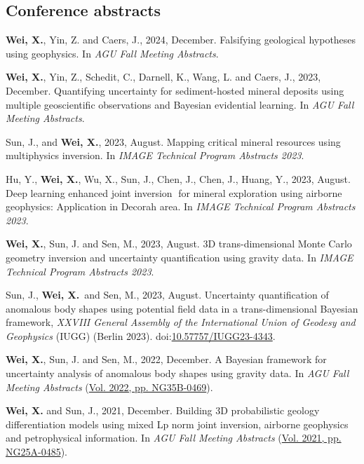 \documentclass[11pt, a4paper]{article}
\newcommand{\LastName}{Wei}
\newcommand{\Initials}{X}
\newcommand{\Wei}{\textbf{\LastName, \Initials.}}  %
\newcommand{\WeiSun}{\textbf{\LastName, \Initials.} and Sun, J.}  %
\newcommand{\DOI}[1]{doi:\href{https://doi.org/#1}{#1}}
\begin{document}
\subsection*{Conference abstracts}
\begin{etaremune}
	\item 	
	\Wei, Yin, Z. and Caers, J., 2024, December. Falsifying geological hypotheses using geophysics. In \emph{AGU Fall Meeting Abstracts}.
	
	\item 
	\Wei, Yin, Z., Schedit, C., Darnell, K., Wang, L. and Caers, J., 2023, December. Quantifying uncertainty for sediment-hosted mineral deposits using multiple geoscientific observations and Bayesian evidential learning. In \emph{AGU Fall Meeting Abstracts}.
	
	\item
	Sun, J., and \Wei, 2023, August. Mapping critical mineral resources using multiphysics inversion. In \emph{IMAGE Technical Program Abstracts 2023}. 
	
	\item
	Hu, Y., \Wei, Wu, X., Sun, J., Chen, J., Chen, J., Huang, Y., 2023, August. Deep learning enhanced joint inversion for mineral exploration using airborne geophysics: Application in Decorah area. In \emph{IMAGE Technical Program Abstracts 2023}.
	
	\item
	\Wei, Sun, J. and Sen, M., 2023, August. 3D trans-dimensional Monte Carlo geometry inversion and uncertainty quantification using gravity data. In \emph{IMAGE Technical Program Abstracts 2023}. 
	
	\item
	Sun, J., \Wei \, and Sen, M., 2023, August. Uncertainty quantification of anomalous body shapes using potential field data in a trans-dimensional Bayesian framework, \emph{XXVIII General Assembly of the International Union of Geodesy and Geophysics} (IUGG) (Berlin 2023).  \DOI{10.57757/IUGG23-4343}.
	
	\item
	\Wei, Sun, J. and Sen, M., 2022, December. A Bayesian framework for uncertainty analysis of anomalous body shapes using gravity data. In \emph{AGU Fall Meeting Abstracts} (\href{https://ui.adsabs.harvard.edu/abs/2022AGUFMNG35B0469W/abstract}{Vol. 2022, pp. NG35B-0469}).

	\item
	\WeiSun, 2021, December. Building 3D probabilistic geology differentiation models using mixed Lp norm joint inversion, airborne geophysics and petrophysical information. In \emph{AGU Fall Meeting Abstracts} (\href{https://ui.adsabs.harvard.edu/abs/2021AGUFMNG25A0485W/abstract}{Vol. 2021, pp. NG25A-0485}).


\end{etaremune}
\end{document}

